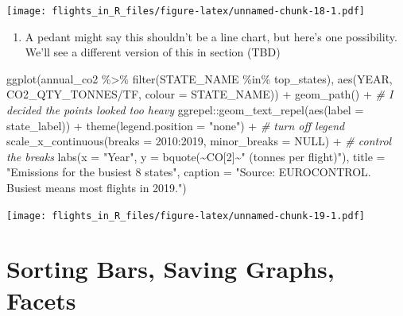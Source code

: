 \documentclass[
]{book}
\newenvironment{Shaded}{\begin{snugshade}}{\end{snugshade}}
\newcommand{\AttributeTok}[1]{\textcolor[rgb]{0.77,0.63,0.00}{#1}}
\newcommand{\CommentTok}[1]{\textcolor[rgb]{0.56,0.35,0.01}{\textit{#1}}}
\newcommand{\ConstantTok}[1]{\textcolor[rgb]{0.00,0.00,0.00}{#1}}
\newcommand{\DecValTok}[1]{\textcolor[rgb]{0.00,0.00,0.81}{#1}}
\newcommand{\FunctionTok}[1]{\textcolor[rgb]{0.00,0.00,0.00}{#1}}
\newcommand{\NormalTok}[1]{#1}
\newcommand{\SpecialCharTok}[1]{\textcolor[rgb]{0.00,0.00,0.00}{#1}}
\newcommand{\StringTok}[1]{\textcolor[rgb]{0.31,0.60,0.02}{#1}}
\providecommand{\tightlist}{%
  \setlength{\itemsep}{0pt}\setlength{\parskip}{0pt}}
\begin{document}
\texttt{[image: flights\_in\_R\_files/figure-latex/unnamed-chunk-18-1.pdf]}

\begin{enumerate}
\def\labelenumi{\arabic{enumi})}
\setcounter{enumi}{3}
\tightlist
\item
  A pedant might say this shouldn't be a line chart, but here's one possibility. We'll see a different version of this in section (TBD)
\end{enumerate}

\begin{Shaded}
\begin{Highlighting}[]
\FunctionTok{ggplot}\NormalTok{(annual\_co2 }\SpecialCharTok{\%\textgreater{}\%} 
         \FunctionTok{filter}\NormalTok{(STATE\_NAME }\SpecialCharTok{\%in\%}\NormalTok{ top\_states), }
       \FunctionTok{aes}\NormalTok{(YEAR, CO2\_QTY\_TONNES}\SpecialCharTok{/}\NormalTok{TF, }
           \AttributeTok{colour =}\NormalTok{ STATE\_NAME)) }\SpecialCharTok{+}
  \FunctionTok{geom\_path}\NormalTok{() }\SpecialCharTok{+} \CommentTok{\# I decided the points looked too heavy}
\NormalTok{  ggrepel}\SpecialCharTok{::}\FunctionTok{geom\_text\_repel}\NormalTok{(}\FunctionTok{aes}\NormalTok{(}\AttributeTok{label =}\NormalTok{ state\_label)) }\SpecialCharTok{+}
  \FunctionTok{theme}\NormalTok{(}\AttributeTok{legend.position =} \StringTok{"none"}\NormalTok{) }\SpecialCharTok{+}  \CommentTok{\# turn off legend}
  \FunctionTok{scale\_x\_continuous}\NormalTok{(}\AttributeTok{breaks =} \DecValTok{2010}\SpecialCharTok{:}\DecValTok{2019}\NormalTok{, }\AttributeTok{minor\_breaks =} \ConstantTok{NULL}\NormalTok{) }\SpecialCharTok{+} \CommentTok{\# control the breaks}
  \FunctionTok{labs}\NormalTok{(}\AttributeTok{x =} \StringTok{"Year"}\NormalTok{, }
       \AttributeTok{y =} \FunctionTok{bquote}\NormalTok{(}\SpecialCharTok{\textasciitilde{}}\NormalTok{CO[}\DecValTok{2}\NormalTok{]}\SpecialCharTok{\textasciitilde{}}\StringTok{" (tonnes per flight)"}\NormalTok{),}
       \AttributeTok{title =} \StringTok{"Emissions for the busiest 8 states"}\NormalTok{,}
       \AttributeTok{caption =} \StringTok{"Source: EUROCONTROL. \textquotesingle{}Busiest\textquotesingle{} means most flights in 2019."}\NormalTok{)}
\end{Highlighting}
\end{Shaded}

\texttt{[image: flights\_in\_R\_files/figure-latex/unnamed-chunk-19-1.pdf]}

\hypertarget{sortbars}{%
\chapter{Sorting Bars, Saving Graphs, Facets}\label{sortbars}}
\end{document}

